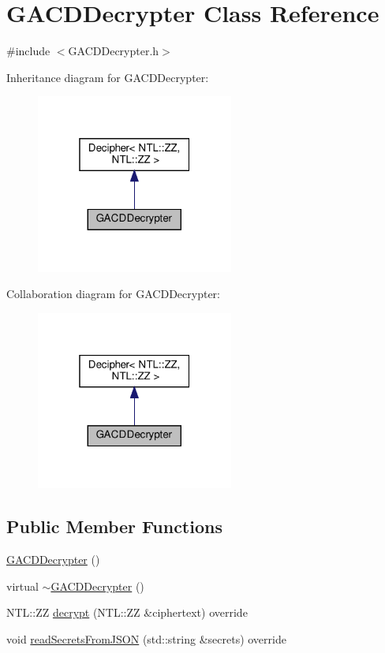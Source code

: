 \hypertarget{classGACDDecrypter}{}\section{G\+A\+C\+D\+Decrypter Class Reference}
\label{classGACDDecrypter}


{\ttfamily \#include $<$G\+A\+C\+D\+Decrypter.\+h$>$}



Inheritance diagram for G\+A\+C\+D\+Decrypter\+:\nopagebreak
\begin{figure}[H]
\begin{center}
\leavevmode
\includegraphics[width=184pt]{classGACDDecrypter__inherit__graph}
\end{center}
\end{figure}


Collaboration diagram for G\+A\+C\+D\+Decrypter\+:\nopagebreak
\begin{figure}[H]
\begin{center}
\leavevmode
\includegraphics[width=184pt]{classGACDDecrypter__coll__graph}
\end{center}
\end{figure}
\subsection*{Public Member Functions}
\begin{DoxyCompactItemize}
\item 
\hyperlink{classGACDDecrypter_a3ce2ad60f6e2a6bb5e474df80e65a61d}{G\+A\+C\+D\+Decrypter} ()
\item 
virtual \hyperlink{classGACDDecrypter_a9f940e67f5747fe8052de483531ebfbf}{$\sim$\+G\+A\+C\+D\+Decrypter} ()
\item 
N\+T\+L\+::\+ZZ \hyperlink{classGACDDecrypter_a92f6afd3d0a43dd5538cf6a83398ee33}{decrypt} (N\+T\+L\+::\+ZZ \&ciphertext) override
\item 
void \hyperlink{classGACDDecrypter_a7634cc069e61c1a3cf2443fed7c2b15f}{read\+Secrets\+From\+J\+S\+ON} (std\+::string \&secrets) override
\end{DoxyCompactItemize}
